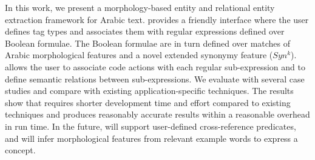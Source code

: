 In this work, we present a morphology-based entity and relational entity extraction framework for Arabic text.
\framework provides a friendly interface where the user defines tag types 
and associates them with regular expressions defined over Boolean formulae.
The Boolean formulae are in turn defined over matches of Arabic morphological features and
a novel extended synonymy feature ($Syn^k$).
\framework allows the user to associate code actions with each regular sub-expression 
and to define semantic relations between sub-expressions. 
We evaluate \framework with several case studies and compare with existing application-specific 
techniques.
The results show that \framework requires shorter development time and effort compared 
to existing techniques and produces reasonably accurate results within a reasonable 
overhead in run time. 
In the future, \framework will support user-defined cross-reference predicates, 
and will infer morphological features from relevant example words to express a concept.

